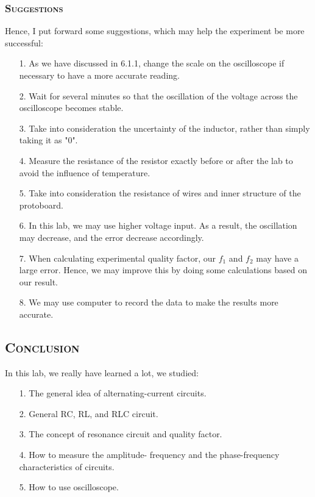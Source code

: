 \documentclass[a4paper,12pt]{article}
\begin{document}
\subsubsection{\textsc{Suggestions}}
Hence, I put forward some suggestions, which may help the experiment be more successful:
\begin{itemize}
\item[1.] As we have discussed in 6.1.1, change the scale on the oscilloscope if necessary to have a more accurate reading.
\item[2.] Wait for several minutes so that the oscillation of the voltage across the oscilloscope becomes stable.
\item[3.] Take into consideration the uncertainty of the inductor, rather than simply taking it as "0".
\item[4.] Measure the resistance of the resistor exactly before or after the lab to avoid the influence of temperature.
\item[5.] Take into consideration the resistance of wires and inner structure of the protoboard.
\item[6.] In this lab, we may use higher voltage input. As a result, the oscillation may decrease, and the error decrease accordingly.
\item[7.] When calculating experimental quality factor, our $f_1$ and $f_2$ may have a large error. Hence, we may improve this by doing some calculations based on our result.
\item[8.] We may use computer to record the data to make the results more accurate.
\end{itemize}

\subsection{\textsc{Conclusion}}
In this lab, we really have learned a lot, we studied:
\begin{itemize}
\item[1.] The general idea of alternating-current circuits.
\item[2.] General RC, RL, and RLC circuit.
\item[3.] The concept of resonance circuit and quality factor.
\item[4.] How to measure the amplitude- frequency and the phase-frequency characteristics of circuits.
\item[5.] How to use oscilloscope.
\end{itemize}
\end{document}
